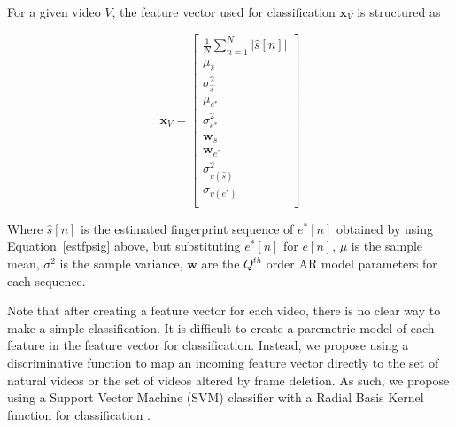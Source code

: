 For a given video $V$, the feature vector used for classification $\bm{x}_{V}$ is structured as

\begin{equation}
  \bm{x}_{V} = \begin{bmatrix}
    \frac{1}{N} \sum_{n=1}^{N} \vert \hat{s}[n] \vert \\
    \mu_{\hat{s}} \\
    \sigma_{\hat{s}}^{2} \\
    \mu_{e^{*}} \\
    \sigma_{e^{*}}^{2} \\
    \bm{w}_{\hat{s}} \\
    \bm{w}_{e^{*}} \\
    \sigma_{v(\hat{s})}^{2} \\
    \sigma_{v(e^{*})} \\
  \end{bmatrix}
\end{equation}

Where $\hat{s}[n]$ is the estimated fingerprint sequence of $e^{*}[n]$ obtained by using Equation~\ref{estfpsig} above, but substituting $e^{*}[n]$ for $e[n]$, $\mu$ is the sample mean, $\sigma^{2}$ is the sample variance, $\bm{w}$ are the $Q^{th}$ order AR model parameters for each sequence.

Note that after creating a feature vector for each video, there is no clear way to make a simple classification. It is difficult to create a paremetric model of each feature in the feature vector for classification. Instead, we propose using a discriminative function to map an incoming feature vector directly to the set of natural videos or the set of videos altered by frame deletion. As such, we propose using a Support Vector Machine (SVM) classifier with a Radial Basis Kernel function for classification \cite{svm}. 